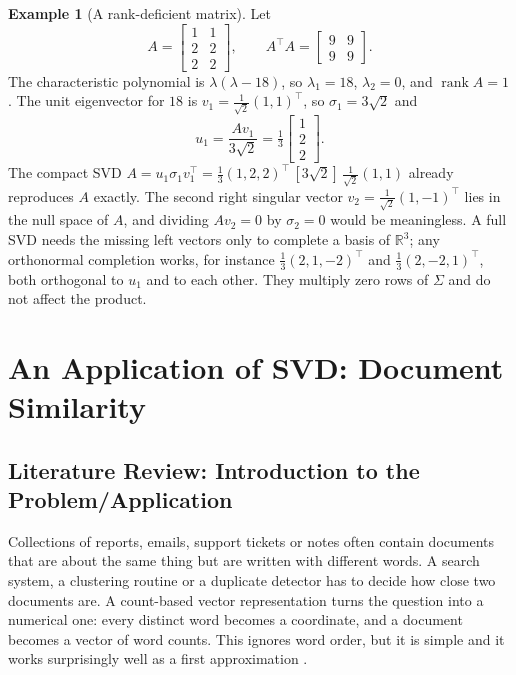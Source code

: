 \documentclass[12pt,a4paper]{report}
\newcommand{\R}{\mathbb{R}}
\newcommand{\T}{^{\top}}
\DeclareMathOperator{\rank}{rank}
\theoremstyle{plain}
\theoremstyle{definition}
\theoremstyle{remark}
\theoremstyle{definition}
\newtheorem{example}{Example}[chapter]
\begin{document}
\begin{example}[A rank-deficient matrix]\label{ex:rankdef}
Let
\[
A=\begin{bmatrix}1&1\\2&2\\2&2\end{bmatrix},\qquad A\T A=\begin{bmatrix}9&9\\9&9\end{bmatrix}.
\]
The characteristic polynomial is $\lambda(\lambda-18)$, so $\lambda_1=18$, $\lambda_2=0$, and $\rank A=1$. The unit eigenvector for $18$ is $v_1=\tfrac1{\sqrt2}(1,1)\T$, so $\sigma_1=3\sqrt2$ and
\[
u_1=\frac{Av_1}{3\sqrt2}=\tfrac13\begin{bmatrix}1\\2\\2\end{bmatrix}.
\]
The compact SVD $A=u_1\sigma_1v_1\T=\tfrac13(1,2,2)\T\,[3\sqrt2]\,\tfrac1{\sqrt2}(1,1)$ already reproduces $A$ exactly. The second right singular vector $v_2=\tfrac1{\sqrt2}(1,-1)\T$ lies in the null space of $A$, and dividing $Av_2=0$ by $\sigma_2=0$ would be meaningless. A full SVD needs the missing left vectors only to complete a basis of $\R^3$; any orthonormal completion works, for instance $\tfrac13(2,1,-2)\T$ and $\tfrac13(2,-2,1)\T$, both orthogonal to $u_1$ and to each other. They multiply zero rows of $\Sigma$ and do not affect the product.
\end{example}

\chapter{An Application of SVD: Document Similarity}

\section{Literature Review: Introduction to the Problem/Application}

Collections of reports, emails, support tickets or notes often contain documents that are about the same thing but are written with different words. A search system, a clustering routine or a duplicate detector has to decide how close two documents are. A count-based vector representation turns the question into a numerical one: every distinct word becomes a coordinate, and a document becomes a vector of word counts. This ignores word order, but it is simple and it works surprisingly well as a first approximation  .
\end{document}
